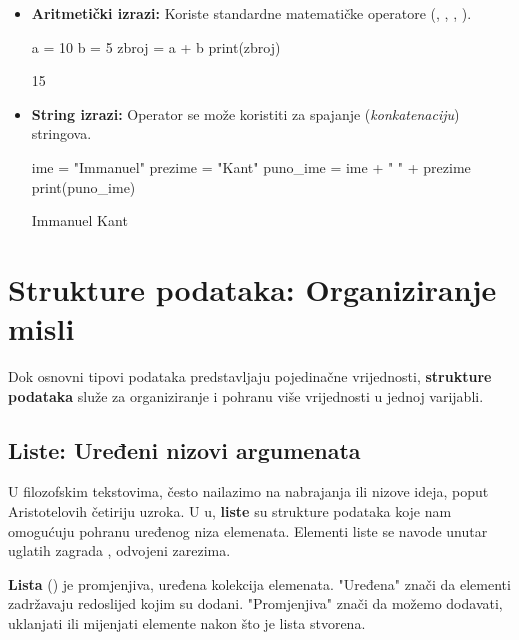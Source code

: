 \begin{itemize}[leftmargin=*]
    \item \textbf{Aritmetički izrazi:} Koriste standardne matematičke operatore (\pyinline{+}, \pyinline{-}, \pyinline{*}, \pyinline{/}).
    \begin{pythoncode}
a = 10
b = 5
zbroj = a + b
print(zbroj)
    \end{pythoncode}
    \begin{codeoutput}
15
    \end{codeoutput}

    \item \textbf{String izrazi:} Operator \pyinline{+} se može koristiti za spajanje (\textit{konkatenaciju}) stringova.
    \begin{pythoncode}
ime = "Immanuel"
prezime = "Kant"
puno_ime = ime + " " + prezime
print(puno_ime)
    \end{pythoncode}
    \begin{codeoutput}
Immanuel Kant
    \end{codeoutput}
\end{itemize}

\section{Strukture podataka: Organiziranje misli}
\label{sec:strukture_podataka}

Dok osnovni tipovi podataka predstavljaju pojedinačne vrijednosti, \textbf{strukture podataka} služe za organiziranje i pohranu više vrijednosti u jednoj varijabli.

\subsection{Liste: Uređeni nizovi argumenata}

U filozofskim tekstovima, često nailazimo na nabrajanja ili nizove ideja, poput Aristotelovih četiriju uzroka. U u, \textbf{liste} su strukture podataka koje nam omogućuju pohranu uređenog niza elemenata. Elementi liste se navode unutar uglatih zagrada \pyinline{[]}, odvojeni zarezima.

\begin{definicijaokvir}
    \textbf{Lista} () je promjenjiva, uređena kolekcija elemenata. "Uređena" znači da elementi zadržavaju redoslijed kojim su dodani. "Promjenjiva" znači da možemo dodavati, uklanjati ili mijenjati elemente nakon što je lista stvorena.
\end{definicijaokvir}

